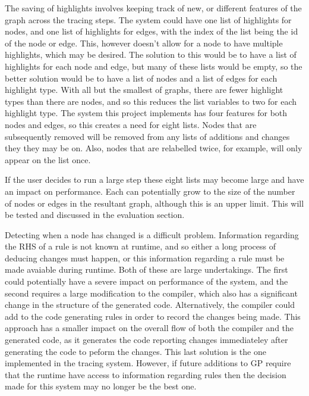 \documentclass{UoYCSproject}
\begin{document}
The saving of highlights involves keeping track of new, or different features of the graph across the tracing steps. The system could have one list of highlights for nodes, and one list of highlights for edges, with the index of the list being the id of the node or edge. This, however doesn't allow for a node to have multiple highlights, which may be desired. The solution to this would be to have a list of highlights for each node and edge, but many of these lists would be empty, so the better solution would be to have a list of nodes and a list of edges for each highlight type. With all but the smallest of graphs, there are fewer highlight types than there are nodes, and so this reduces the list variables to two for each highlight type. The system this project implements has four features for both nodes and edges, so this creates a need for eight lists. Nodes that are subsequently removed will be removed from any lists of additions and changes they they may be on. Also, nodes that are relabelled twice, for example, will only appear on the list once.

If the user decides to run a large step these eight lists may become large and have an impact on performance. Each can potentially grow to the size of the number of nodes or edges in the resultant graph, although this is an upper limit. This will be tested and discussed in the evaluation section. %

Detecting when a node has changed is a difficult problem. Information regarding the RHS of a rule is not known at runtime, and so either a long process of deducing changes must happen, or this information regarding a rule must be made avaiable during runtime. Both of these are large undertakings. The first could potentially have a severe impact on performance of the system, and the second requires a large modification to the compiler, which also has a significant change in the structure of the generated code. Alternatively, the compiler could add to the code generating rules in order to record the changes being made. This approach has a smaller impact on the overall flow of both the compiler and the generated code, as it generates the code reporting changes immediateley after generating the code to peform the changes. This last solution is the one implemented in the tracing system. However, if future additions to GP require that the runtime have access to information regarding rules then the decision made for this system may no longer be the best one.

\end{document}
